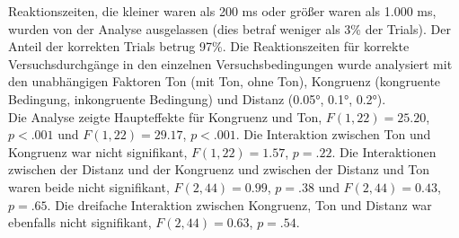 Reaktionszeiten, die kleiner waren als 200 ms oder größer waren als 1.000 ms, wurden von der Analyse ausgelassen (dies betraf weniger als 3\% der Trials). Der Anteil der korrekten Trials betrug 97\%. Die Reaktionszeiten für korrekte Versuchsdurchgänge in den einzelnen Versuchsbedingungen wurde analysiert mit den unabhängigen Faktoren Ton (mit Ton, ohne Ton), Kongruenz (kongruente Bedingung, inkongruente Bedingung) und Distanz (0.05°, 0.1°, 0.2°).\\
Die Analyse zeigte Haupteffekte für Kongruenz und Ton, $F(1,22)=25.20$, $p<.001$ und $F(1,22)=29.17$, $p<.001$. Die Interaktion zwischen Ton und Kongruenz war nicht signifikant, $F(1,22)=1.57$, $p=.22$. Die Interaktionen zwischen der Distanz und der Kongruenz und zwischen der Distanz und Ton waren beide nicht signifikant, $F(2,44)=0.99$, $p=.38$ und $F(2,44)=0.43$, $p=.65$. Die dreifache Interaktion zwischen Kongruenz, Ton und Distanz war ebenfalls nicht signifikant, $F(2,44)=0.63$, $p=.54$.
